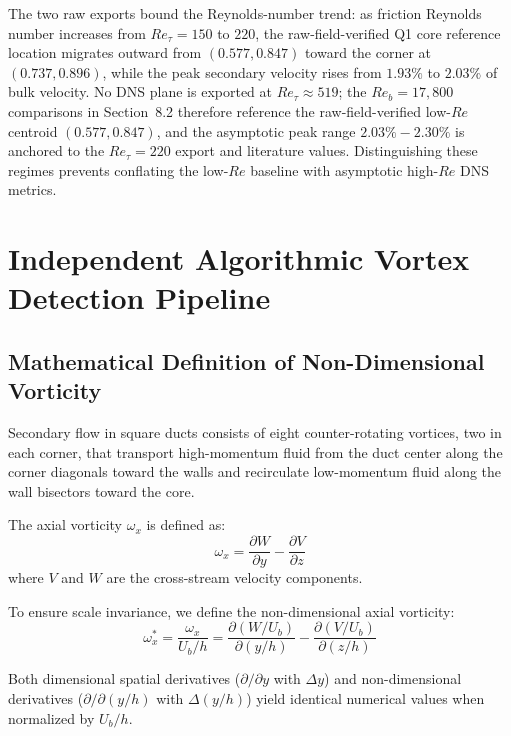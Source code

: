 \documentclass[11pt,a4paper]{article}
\begin{document}
The two raw exports bound the Reynolds-number trend: as friction Reynolds number increases from $Re_\tau = 150$ to $220$, the raw-field-verified Q1 core reference location migrates outward from $(0.577, 0.847)$ toward the corner at $(0.737, 0.896)$, while the peak secondary velocity rises from $1.93\%$ to $2.03\%$ of bulk velocity. No DNS plane is exported at $Re_\tau \approx 519$; the $Re_b = 17{,}800$ comparisons in Section~8.2 therefore reference the raw-field-verified low-$Re$ centroid $(0.577, 0.847)$, and the asymptotic peak range $2.03\% - 2.30\%$ is anchored to the $Re_\tau = 220$ export and literature values. Distinguishing these regimes prevents conflating the low-$Re$ baseline with asymptotic high-$Re$ DNS metrics.

\section{Independent Algorithmic Vortex Detection Pipeline}

\subsection{Mathematical Definition of Non-Dimensional Vorticity}
Secondary flow in square ducts consists of eight counter-rotating vortices, two in each corner, that transport high-momentum fluid from the duct center along the corner diagonals toward the walls and recirculate low-momentum fluid along the wall bisectors toward the core.

The axial vorticity $\omega_x$ is defined as:
\begin{equation}
\omega_x = \frac{\partial W}{\partial y} - \frac{\partial V}{\partial z}
\end{equation}
where $V$ and $W$ are the cross-stream velocity components.

To ensure scale invariance, we define the non-dimensional axial vorticity:
\begin{equation}
\omega_x^* = \frac{\omega_x}{U_b / h} = \frac{\partial(W/U_b)}{\partial(y/h)} - \frac{\partial(V/U_b)}{\partial(z/h)}
\label{eq:vorticity_norm}
\end{equation}

Both dimensional spatial derivatives ($\partial / \partial y$ with $\Delta y$) and non-dimensional derivatives ($\partial / \partial (y/h)$ with $\Delta(y/h)$) yield identical numerical values when normalized by $U_b / h$.
\end{document}
